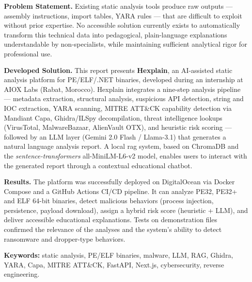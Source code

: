 \textbf{Problem Statement.} Existing static analysis tools produce raw outputs --- assembly instructions, import tables, YARA rules --- that are difficult to exploit without prior expertise. No accessible solution currently exists to automatically transform this technical data into pedagogical, plain-language explanations understandable by non-specialists, while maintaining sufficient analytical rigor for professional use.

\textbf{Developed Solution.} This report presents \textbf{Hexplain}, an AI-assisted static analysis platform for PE/ELF/.NET binaries, developed during an internship at AIOX Labs (Rabat, Morocco). Hexplain integrates a nine-step analysis pipeline --- metadata extraction, structural analysis, suspicious API detection, string and IOC extraction, YARA scanning, MITRE ATT\&CK capability detection via Mandiant Capa, Ghidra/ILSpy decompilation, threat intelligence lookups (VirusTotal, MalwareBazaar, AlienVault OTX), and heuristic risk scoring --- followed by an LLM layer (Gemini 2.0 Flash / Llama-3.1) that generates a natural language analysis report. A local \acrfull{rag} system, based on ChromaDB and the \textit{sentence-transformers} all-MiniLM-L6-v2 model, enables users to interact with the generated report through a contextual educational chatbot.

\textbf{Results.} The platform was successfully deployed on DigitalOcean via Docker Compose and a GitHub Actions CI/CD pipeline. It can analyze PE32, PE32+ and ELF 64-bit binaries, detect malicious behaviors (process injection, persistence, payload download), assign a hybrid risk score (heuristic + LLM), and deliver accessible educational explanations. Tests on demonstration files confirmed the relevance of the analyses and the system's ability to detect ransomware and dropper-type behaviors.

\vspace{0.4cm}
\noindent\textbf{Keywords:} static analysis, PE/ELF binaries, malware, LLM, RAG, Ghidra, YARA, Capa, MITRE ATT\&CK, FastAPI, Next.js, cybersecurity, reverse engineering.

\clearpage
\listoffigures
{}

\clearpage
\tableofcontents

\clearpage
\printglossary[type=\acronymtype, title={Liste des Sigles et Acronymes}]
